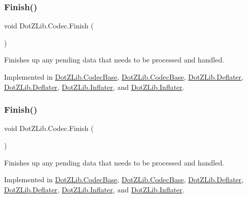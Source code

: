 \subsubsection{\texorpdfstring{Finish()}{Finish()}\hspace{0.1cm}{\footnotesize\ttfamily [1/2]}}
{\footnotesize\ttfamily void Dot\+Z\+Lib.\+Codec.\+Finish (\begin{DoxyParamCaption}{ }\end{DoxyParamCaption})}



Finishes up any pending data that needs to be processed and handled. 



Implemented in \hyperlink{class_dot_z_lib_1_1_codec_base_abab96cb01a9b983452a31777e3a1e633}{Dot\+Z\+Lib.\+Codec\+Base}, \hyperlink{class_dot_z_lib_1_1_codec_base_abab96cb01a9b983452a31777e3a1e633}{Dot\+Z\+Lib.\+Codec\+Base}, \hyperlink{class_dot_z_lib_1_1_deflater_a84507769a20a13c2ff48cfcef8f5c13b}{Dot\+Z\+Lib.\+Deflater}, \hyperlink{class_dot_z_lib_1_1_deflater_a84507769a20a13c2ff48cfcef8f5c13b}{Dot\+Z\+Lib.\+Deflater}, \hyperlink{class_dot_z_lib_1_1_inflater_aa70c9d026f5d1b44fe0679b78973285c}{Dot\+Z\+Lib.\+Inflater}, and \hyperlink{class_dot_z_lib_1_1_inflater_aa70c9d026f5d1b44fe0679b78973285c}{Dot\+Z\+Lib.\+Inflater}.

\mbox{\label{interface_dot_z_lib_1_1_codec_af12b887d445dcbc5e7c11b3aa000aa27}} 
\subsubsection{\texorpdfstring{Finish()}{Finish()}\hspace{0.1cm}{\footnotesize\ttfamily [2/2]}}
{\footnotesize\ttfamily void Dot\+Z\+Lib.\+Codec.\+Finish (\begin{DoxyParamCaption}{ }\end{DoxyParamCaption})}



Finishes up any pending data that needs to be processed and handled. 



Implemented in \hyperlink{class_dot_z_lib_1_1_codec_base_abab96cb01a9b983452a31777e3a1e633}{Dot\+Z\+Lib.\+Codec\+Base}, \hyperlink{class_dot_z_lib_1_1_codec_base_abab96cb01a9b983452a31777e3a1e633}{Dot\+Z\+Lib.\+Codec\+Base}, \hyperlink{class_dot_z_lib_1_1_deflater_a84507769a20a13c2ff48cfcef8f5c13b}{Dot\+Z\+Lib.\+Deflater}, \hyperlink{class_dot_z_lib_1_1_deflater_a84507769a20a13c2ff48cfcef8f5c13b}{Dot\+Z\+Lib.\+Deflater}, \hyperlink{class_dot_z_lib_1_1_inflater_aa70c9d026f5d1b44fe0679b78973285c}{Dot\+Z\+Lib.\+Inflater}, and \hyperlink{class_dot_z_lib_1_1_inflater_aa70c9d026f5d1b44fe0679b78973285c}{Dot\+Z\+Lib.\+Inflater}.



